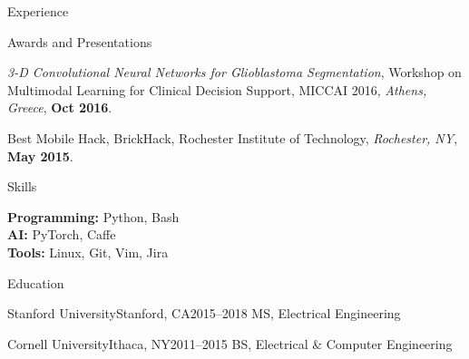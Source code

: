 \documentclass{resume}
\begin{document}
\begin{rSection}{Experience}

\end{rSection}

\begin{rSection}{Awards and Presentations}

    {\em 3-D Convolutional Neural Networks for Glioblastoma Segmentation}, Workshop on Multimodal Learning for Clinical Decision Support, MICCAI 2016, {\em Athens, Greece}, {\bf Oct 2016}.

    Best Mobile Hack, BrickHack, Rochester Institute of Technology, {\em Rochester, NY}, {\bf May 2015}.

\end{rSection}

\begin{rSection}{Skills}

    {\bf Programming:} Python, Bash\\
    {\bf AI:} PyTorch, Caffe\\
    {\bf Tools:} Linux, Git, Vim, Jira

\end{rSection}

\begin{rSection}{Education}

    \begin{rEducation}{Stanford University}{Stanford, CA}{2015--2018}
        MS, Electrical Engineering
    \end{rEducation}

    \begin{rEducation}{Cornell University}{Ithaca, NY}{2011--2015}
        BS, Electrical \& Computer Engineering
    \end{rEducation}

\end{rSection}
\end{document}
